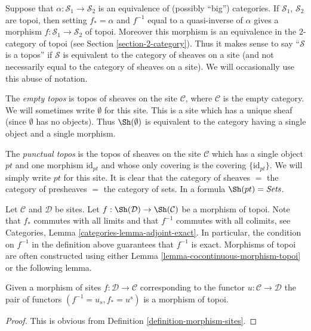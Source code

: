 \noindent
Suppose that $\alpha : \mathcal{S}_1 \to \mathcal{S}_2$ is an equivalence of
(possibly ``big'') categories. If $\mathcal{S}_1$, $\mathcal{S}_2$
are topoi, then setting $f_* = \alpha$ and $f^{-1}$ equal to a quasi-inverse
of $\alpha$ gives a morphism $f : \mathcal{S}_1 \to \mathcal{S}_2$ of topoi.
Moreover this morphism is an equivalence in the $2$-category of topoi (see
Section \ref{section-2-category}).
Thus it makes sense to say ``$\mathcal{S}$ is a topos'' if $\mathcal{S}$
is equivalent to the category of sheaves on a site (and not necessarily
equal to the category of sheaves on a site). We will occasionally
use this abuse of notation.

\medskip\noindent
The {\it empty topos} is topos
of sheaves on the site $\mathcal{C}$, where $\mathcal{C}$
is the empty category. We will sometimes write $\emptyset$ for this site.
This is a site which has a unique sheaf (since $\emptyset$ has no
objects). Thus $\Sh(\emptyset)$ is equivalent to the category
having a single object and a single morphism.

\medskip\noindent
The {\it punctual topos} is the topos of sheaves on the site
$\mathcal{C}$ which has a single object $pt$ and one morphism
$\text{id}_{pt}$ and whose only covering is the covering
$\{\text{id}_{pt}\}$. We will simply write $pt$ for this site.
It is clear that the category of sheaves $ = $ the category of
presheaves $ = $ the category of sets.
In a formula $\Sh(pt) = \textit{Sets}$.

\medskip\noindent
Let $\mathcal{C}$ and $\mathcal{D}$ be sites. Let
$f : \Sh(\mathcal{D}) \to \Sh(\mathcal{C})$ be a morphism of topoi.
Note that $f_*$ commutes with all limits and that
$f^{-1}$ commutes with all colimits, see Categories,
Lemma \ref{categories-lemma-adjoint-exact}.
In particular, the condition on $f^{-1}$ in the definition above
guarantees that $f^{-1}$ is exact. Morphisms of topoi are often constructed
using either Lemma \ref{lemma-cocontinuous-morphism-topoi}
or the following lemma.

\begin{lemma}
\label{lemma-morphism-sites-topoi}
Given a morphism of sites $f : \mathcal{D} \to \mathcal{C}$
corresponding to the functor $u : \mathcal{C} \to \mathcal{D}$
the pair of functors $(f^{-1} = u_s, f_* = u^s)$ is a morphism of topoi.
\end{lemma}

\begin{proof}
This is obvious from Definition \ref{definition-morphism-sites}.
\end{proof}


